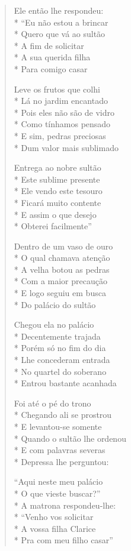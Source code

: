 \begin{verse}
Ele então lhe respondeu:\\*
``Eu não estou a brincar\\*
Quero que vá ao sultão\\*
A fim de solicitar\\*
A sua querida filha\\*
Para comigo casar

Leve os frutos que colhi\\*
Lá no jardim encantado\\*
Pois eles não são de vidro\\*
Como tínhamos pensado\\*
E sim, pedras preciosas\\*
Dum valor mais sublimado

Entrega ao nobre sultão\\*
Este sublime presente\\*
Ele vendo este tesouro\\*
Ficará muito contente\\*
E assim o que desejo\\*
Obterei facilmente''

Dentro de um vaso de ouro\\*
O qual chamava atenção\\*
A velha botou as pedras\\*
Com a maior precaução\\*
E logo seguiu em busca\\*
Do palácio do sultão

Chegou ela no palácio\\*
Decentemente trajada\\*
Porém só no fim do dia\\*
Lhe concederam entrada\\*
No quartel do soberano\\*
Entrou bastante acanhada

Foi até o pé do trono\\*
Chegando ali se prostrou\\*
E levantou-se somente\\*
Quando o sultão lhe ordenou\\*
E com palavras severas\\*
Depressa lhe perguntou:

``Aqui neste meu palácio\\*
O que vieste buscar?''\\*
A matrona respondeu-lhe:\\*
``Venho vos solicitar\\*
A vossa filha Clarice\\*
Pra com meu filho casar''


\end{verse}
